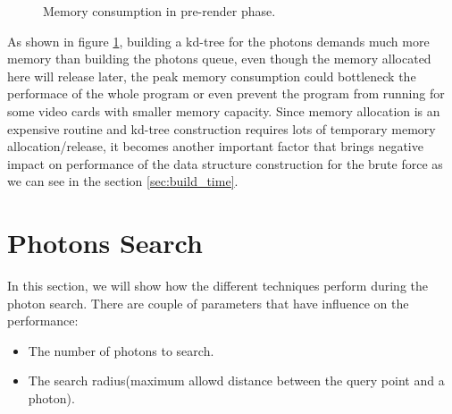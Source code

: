 \begin{figure}[ftp] 
    \centering 
    \renewcommand{\thefigure}{\thechapter.\arabic{figure}}
    \caption[]{Memory consumption in pre-render phase. }
    \label{fig:memory_consumption_2}  
\end{figure}   

As shown in figure \ref{fig:memory_consumption_2}, building a kd-tree for the photons demands much more memory than building the photons queue, even though the memory allocated here will release later, the peak memory consumption could bottleneck the performace of the whole program or even prevent the program from running for some video cards with smaller memory capacity. Since memory allocation is an expensive routine and kd-tree construction requires lots of temporary memory allocation/release, it becomes another important factor that brings negative impact on performance of the data structure construction for the brute force as we can see in the section \ref{sec:build_time}.  

\section{Photons Search}

In this section, we will show how the different techniques perform during the photon search. There are couple of parameters that have influence on the performance: 

\begin{itemize}

\item{The number of photons to search. }

\item{The search radius(maximum allowd distance between the query point and a photon). } 

\end{itemize} 

